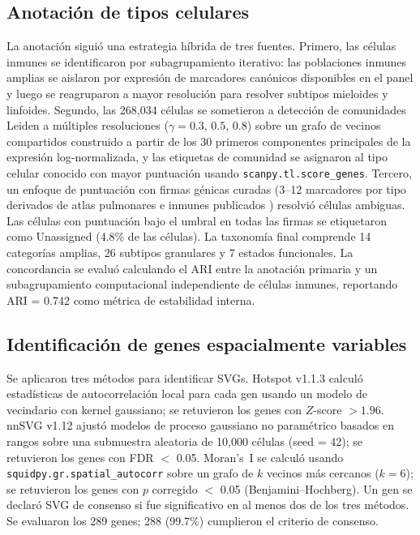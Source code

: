 \documentclass[12pt,a4paper]{article}
\begin{document}
\subsection*{Anotación de tipos celulares}
La anotación siguió una estrategia híbrida de tres fuentes. Primero, las células inmunes se identificaron por subagrupamiento iterativo: las poblaciones inmunes amplias se aislaron por expresión de marcadores canónicos disponibles en el panel y luego se reagruparon a mayor resolución para resolver subtipos mieloides y linfoides. Segundo, las 268,034 células se sometieron a detección de comunidades Leiden a múltiples resoluciones ($\gamma = 0.3$, $0.5$, $0.8$) sobre un grafo de vecinos compartidos construido a partir de los 30 primeros componentes principales de la expresión log-normalizada, y las etiquetas de comunidad se asignaron al tipo celular conocido con mayor puntuación usando \texttt{scanpy.tl.score\_genes}. Tercero, un enfoque de puntuación con firmas génicas curadas (3--12 marcadores por tipo derivados de atlas pulmonares e inmunes publicados \citep{travaglini2020molecular}) resolvió células ambiguas. Las células con puntuación bajo el umbral en todas las firmas se etiquetaron como Unassigned (4.8\% de las células). La taxonomía final comprende 14 categorías amplias, 26 subtipos granulares y 7 estados funcionales. La concordancia se evaluó calculando el ARI entre la anotación primaria y un subagrupamiento computacional independiente de células inmunes, reportando ARI = 0.742 como métrica de estabilidad interna.

\subsection*{Identificación de genes espacialmente variables}
Se aplicaron tres métodos para identificar SVGs. Hotspot \citep{detomaso2021hotspot} v1.1.3 calculó estadísticas de autocorrelación local para cada gen usando un modelo de vecindario con kernel gaussiano; se retuvieron los genes con $Z$-score $> 1.96$. nnSVG \citep{weber2023nnsvg} v1.12 ajustó modelos de proceso gaussiano no paramétrico basados en rangos sobre una submuestra aleatoria de 10,000 células (seed = 42); se retuvieron los genes con FDR $<$ 0.05. Moran's~I se calculó usando \texttt{squidpy.gr.spatial\_autocorr} \citep{palla2022squidpy} sobre un grafo de $k$ vecinos más cercanos ($k=6$); se retuvieron los genes con $p$ corregido $<$ 0.05 (Benjamini--Hochberg). Un gen se declaró SVG de consenso si fue significativo en al menos dos de los tres métodos. Se evaluaron los 289 genes; 288 (99.7\%) cumplieron el criterio de consenso.
\end{document}

